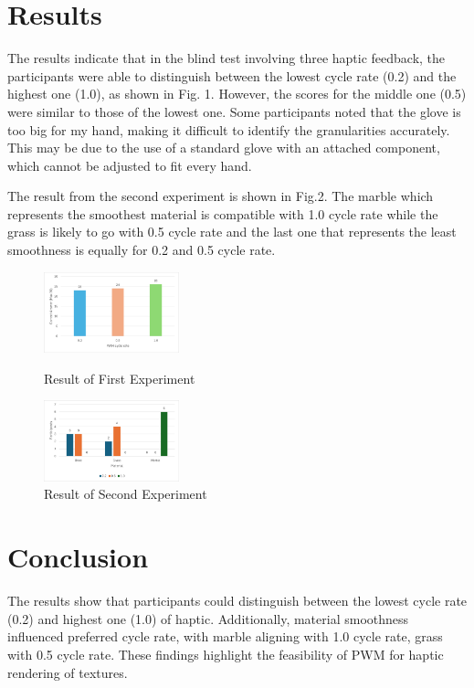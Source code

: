 \documentclass[a4paper,twocolumn]{article}
\begin{document}
\section{Results}
The results indicate that in the blind test involving three haptic feedback, the  participants were able to distinguish between the lowest cycle rate (0.2) and the highest one (1.0), as shown in Fig. 1. However, the scores for the middle one (0.5) were similar to those of the lowest one. Some participants noted that the glove is too big for my hand, making it difficult to identify the granularities accurately. This may be due to the use of a standard glove with an attached component, which cannot be adjusted to fit every hand.\par
The result from the second experiment is shown in Fig.2. The marble which represents the smoothest material is compatible with 1.0 cycle rate while the grass is likely to go with 0.5 cycle rate and the last one that represents the least smoothness is equally for 0.2 and 0.5 cycle rate.

\begin{figure}[h]
  \centering
  \includegraphics[width=0.35\textwidth]{./Fig/PWM_Correct_Test.png}
  \caption{{Result of First Experiment}}
  \label{fig1}
  \vspace{0.1cm}
  \centering
  \includegraphics[width=0.35\textwidth]{./Fig/Texture_Select_Test.png}
  \caption{{Result of Second Experiment}}
  \label{fig2}
\end{figure}

\section{Conclusion}
The results show that participants could distinguish between the lowest cycle rate (0.2) and highest one (1.0) of haptic. Additionally, material smoothness influenced preferred cycle rate, with marble aligning with 1.0 cycle rate, grass with 0.5 cycle rate. These findings highlight the feasibility of PWM for haptic rendering of textures.
\end{document}
